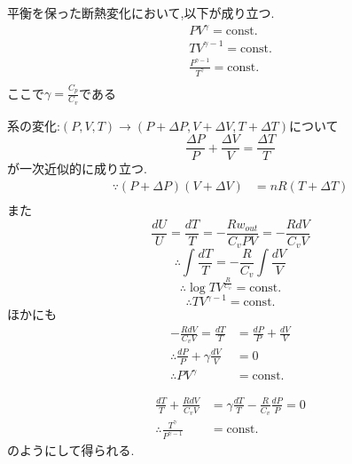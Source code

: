 \documentclass[dvipdfmx,uplatex]{jsarticle}
\begin{document}
\begin{theo}[Poissonの法則]
平衡を保った断熱変化において,以下が成り立つ.
\begin{align*}
PV^{\gamma} = \mathrm{const.} \\
TV^{\gamma -1} = \mathrm{const.} \\
\frac{P^{\gamma -1}}{T^{\gamma}} = \mathrm{const.} \\
\end{align*}
ここで$\gamma = \frac{C_p}{C_v}$である
\end{theo} 
系の変化:$(P,V,T) \rightarrow (P + \Delta P,V + \Delta V,T + \Delta T)$について
\[
\frac{\Delta P}{P} + \frac{\Delta V}{V} = \frac{\Delta T}{T}
\]
が一次近似的に成り立つ.
\begin{align*}
\because (P + \Delta P)(V + \Delta V) &= nR (T + \Delta T) \\
\end{align*}
また
\[
\frac{dU}{U} = \frac{dT}{T} = - \frac{Rw_{out}}{C_vPV} = -\frac{RdV}{C_vV}
\]
\[
\therefore \int \frac{dT}{T} = - \frac{R}{C_v} \int \frac{dV}{V}
\]
\[
\therefore \log TV^{\frac{R}{C_v}} = \mathrm{const.}
\]
\[
\therefore TV^{\gamma - 1} = \mathrm{const.}
\]
ほかにも
\begin{align*}
 -\frac{RdV}{C_vV} = \frac{dT}{T} &= \frac{d P}{P} + \frac{d V}{V} \\
 \therefore \frac{d P}{P} + \gamma \frac{d V}{V} &= 0 \\
 \therefore PV^{\gamma} &= \mathrm{const.}
\end{align*}

\begin{align*}
 \frac{dT}{T} + \frac{RdV}{C_vV} &= \gamma \frac{dT}{T} - \frac{R}{C_v} \frac{d P}{P} = 0 \\
 \therefore \frac{T^{\gamma}}{P^{\gamma -1}} &= \mathrm{const.}
\end{align*}
のようにして得られる.
\end{document}
